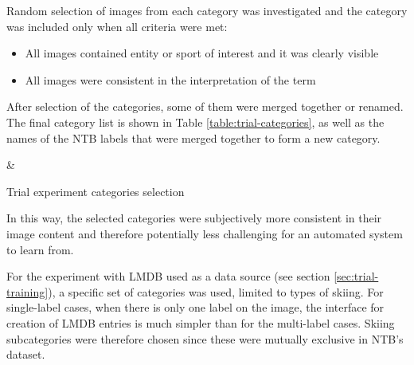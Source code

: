     Random selection of images from each category was investigated and the category was included only when all criteria were met:
    \begin{itemize}
        \item All images contained entity or sport of interest and it was clearly visible
        \item All images were consistent in the interpretation of the term
    \end{itemize}
    
    After selection of the categories, some of them were merged together or renamed. The final category list is shown in Table \ref{table:trial-categories}, as well as the names of the NTB labels that were merged together to form a new category.
    
    \begin{table}[H]
    \centering
    {}
    {\category & \ntbcategories}
    
    \caption{Trial experiment categories selection}
    \label{table:trial-categories}
    \end{table}
    
    In this way, the selected categories were subjectively more consistent in their image content and therefore potentially less challenging for an automated system to learn from.
    
    For the experiment with LMDB \cite{lmdb} used as a data source (see section \ref{sec:trial-training}), a specific set of categories was used, limited to types of skiing. For single-label cases, when there is only one label on the image, the interface for creation of LMDB entries is much simpler than for the multi-label cases. Skiing subcategories were therefore chosen since these were mutually exclusive in NTB's dataset.
    
